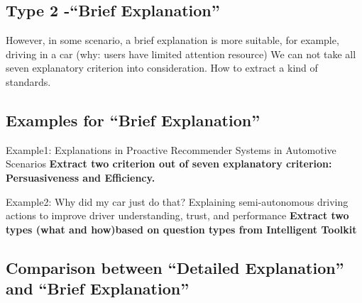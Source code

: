 \subsection{Type 2 -``Brief Explanation''}
    However, in some scenario, a brief explanation is more suitable, for example, driving in a car
    (why: users have limited attention resource)
    We can not take all seven explanatory criterion into consideration.
    How to extract a kind of standards.
\subsection{Examples for ``Brief Explanation''}
    Example1: Explanations in Proactive Recommender Systems in Automotive Scenarios \cite{bader122011explanations}
    \textbf{Extract two criterion out of seven explanatory criterion: Persuasiveness and Efficiency.}

    Example2: Why did my car just do that? Explaining semi-autonomous driving actions to improve driver understanding, trust, and performance\cite{koo2015did}
    \textbf{Extract two types (what and how)based on question types from Intelligent Toolkit} \cite{Brian2010toolkit, lim2011design}
\subsection{Comparison between ``Detailed Explanation'' and ``Brief Explanation''}
